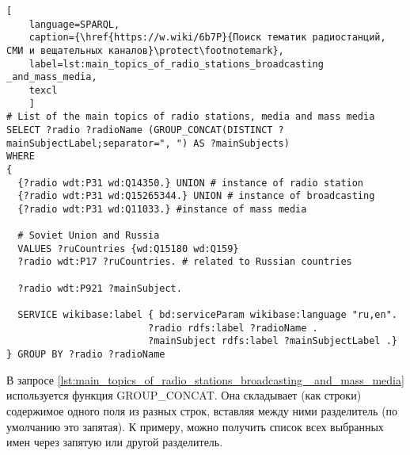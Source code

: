 \begin{lstlisting}[ 
    language=SPARQL,
    caption={\href{https://w.wiki/6b7P}{Поиск тематик радиостанций, СМИ и вещательных каналов}\protect\footnotemark},
    label=lst:main_topics_of_radio_stations_broadcasting _and_mass_media,
    texcl
    ]
# List of the main topics of radio stations, media and mass media
SELECT ?radio ?radioName (GROUP_CONCAT(DISTINCT ?mainSubjectLabel;separator=", ") AS ?mainSubjects) 
WHERE
{
  {?radio wdt:P31 wd:Q14350.} UNION # instance of radio station
  {?radio wdt:P31 wd:Q15265344.} UNION # instance of broadcasting
  {?radio wdt:P31 wd:Q11033.} #instance of mass media
  
  # Soviet Union and Russia
  VALUES ?ruCountries {wd:Q15180 wd:Q159}
  ?radio wdt:P17 ?ruCountries. # related to Russian countries
  
  ?radio wdt:P921 ?mainSubject.
  
  SERVICE wikibase:label { bd:serviceParam wikibase:language "ru,en".
                         ?radio rdfs:label ?radioName .
                         ?mainSubject rdfs:label ?mainSubjectLabel .}
} GROUP BY ?radio ?radioName\end{lstlisting}%


В запросе \ref{lst:main_topics_of_radio_stations_broadcasting _and_mass_media} используется функция GROUP_CONCAT. Она складывает (как строки) содержимое одного поля из разных строк, вставляя между ними разделитель (по умолчанию это запятая). К примеру, можно получить список всех выбранных имен через запятую или другой разделитель.

\newpage

